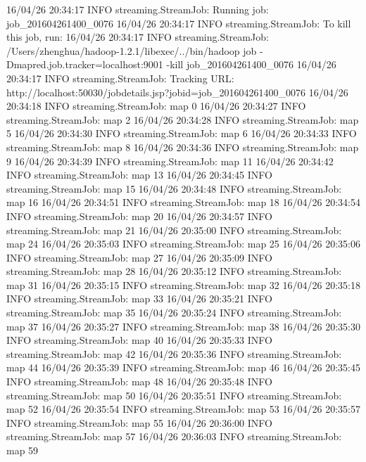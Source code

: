 16/04/26 20:34:17 INFO streaming.StreamJob: Running job: job_201604261400_0076
16/04/26 20:34:17 INFO streaming.StreamJob: To kill this job, run:
16/04/26 20:34:17 INFO streaming.StreamJob: /Users/zhenghua/hadoop-1.2.1/libexec/../bin/hadoop job  -Dmapred.job.tracker=localhost:9001 -kill job_201604261400_0076
16/04/26 20:34:17 INFO streaming.StreamJob: Tracking URL: http://localhost:50030/jobdetails.jsp?jobid=job_201604261400_0076
16/04/26 20:34:18 INFO streaming.StreamJob:  map 0%
16/04/26 20:34:27 INFO streaming.StreamJob:  map 2%
16/04/26 20:34:28 INFO streaming.StreamJob:  map 5%
16/04/26 20:34:30 INFO streaming.StreamJob:  map 6%
16/04/26 20:34:33 INFO streaming.StreamJob:  map 8%
16/04/26 20:34:36 INFO streaming.StreamJob:  map 9%
16/04/26 20:34:39 INFO streaming.StreamJob:  map 11%
16/04/26 20:34:42 INFO streaming.StreamJob:  map 13%
16/04/26 20:34:45 INFO streaming.StreamJob:  map 15%
16/04/26 20:34:48 INFO streaming.StreamJob:  map 16%
16/04/26 20:34:51 INFO streaming.StreamJob:  map 18%
16/04/26 20:34:54 INFO streaming.StreamJob:  map 20%
16/04/26 20:34:57 INFO streaming.StreamJob:  map 21%
16/04/26 20:35:00 INFO streaming.StreamJob:  map 24%
16/04/26 20:35:03 INFO streaming.StreamJob:  map 25%
16/04/26 20:35:06 INFO streaming.StreamJob:  map 27%
16/04/26 20:35:09 INFO streaming.StreamJob:  map 28%
16/04/26 20:35:12 INFO streaming.StreamJob:  map 31%
16/04/26 20:35:15 INFO streaming.StreamJob:  map 32%
16/04/26 20:35:18 INFO streaming.StreamJob:  map 33%
16/04/26 20:35:21 INFO streaming.StreamJob:  map 35%
16/04/26 20:35:24 INFO streaming.StreamJob:  map 37%
16/04/26 20:35:27 INFO streaming.StreamJob:  map 38%
16/04/26 20:35:30 INFO streaming.StreamJob:  map 40%
16/04/26 20:35:33 INFO streaming.StreamJob:  map 42%
16/04/26 20:35:36 INFO streaming.StreamJob:  map 44%
16/04/26 20:35:39 INFO streaming.StreamJob:  map 46%
16/04/26 20:35:45 INFO streaming.StreamJob:  map 48%
16/04/26 20:35:48 INFO streaming.StreamJob:  map 50%
16/04/26 20:35:51 INFO streaming.StreamJob:  map 52%
16/04/26 20:35:54 INFO streaming.StreamJob:  map 53%
16/04/26 20:35:57 INFO streaming.StreamJob:  map 55%
16/04/26 20:36:00 INFO streaming.StreamJob:  map 57%
16/04/26 20:36:03 INFO streaming.StreamJob:  map 59%
